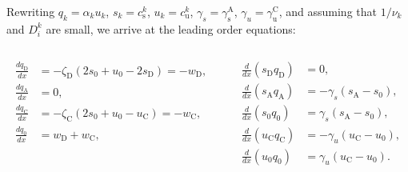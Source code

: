 \documentclass{beamer}
\begin{document}
\begin{frame}{}
    Rewriting $q_k = \alpha_ku_k$, $s_k = c_\mathrm{s}^k$, $u_k = c_\mathrm{u}^k$, $\gamma_s = \gamma_\mathrm{s}^\mathrm{A}$, $\gamma_u = \gamma_\mathrm{u}^\mathrm{C}$, and assuming that $1/\nu_k$ and $D_i^k$ are small, we arrive at the leading order equations:
    \begin{columns}[T]

        \begin{column}{0.5\textwidth}
            \begin{align}
                \frac{dq_\mathrm{D}}{dx} &= -\zeta_\mathrm{D}\left( 2s_0+u_0 - 2s_\mathrm{D} \right) = -w_\mathrm{D},\label{eq:q_D_eq}\\
                \frac{dq_\mathrm{A}}{dx} &= 0,\label{eq:q_A_eq}\\
                \frac{dq_\mathrm{C}}{dx} &= -\zeta_\mathrm{C}\left( 2s_0+u_0 - u_\mathrm{C} \right) = -w_\mathrm{C},\label{eq:q_C_eq}\\
                \frac{dq_0}{dx} &= w_\mathrm{D}+w_\mathrm{C},\label{eq:q_0_eq}
            \end{align}
        \end{column}
        
        \begin{column}{0.5\textwidth}
            \begin{align}
                \frac{d}{dx}(s_\mathrm{D}q_\mathrm{D}) &= 0,\label{eq:s_D_eq}\\
                \frac{d}{dx}(s_\mathrm{A}q_\mathrm{A}) &= -\gamma_s(s_\mathrm{A} - s_0),\label{eq:s_A_eq}\\
                \frac{d}{dx}(s_\mathrm{0}q_\mathrm{0}) &= \gamma_s(s_\mathrm{A} - s_0),\label{eq:s_0_eq}\\
                \frac{d}{dx}(u_\mathrm{C}q_\mathrm{C}) &= -\gamma_u(u_\mathrm{C} - u_0),\label{eq:u_C_eq}\\
                \frac{d}{dx}(u_\mathrm{0}q_\mathrm{0}) &= \gamma_u(u_\mathrm{C} - u_0).\label{eq:u_0_eq}
            \end{align}
        \end{column}
    
    \end{columns}
    
\end{frame}
\end{document}
